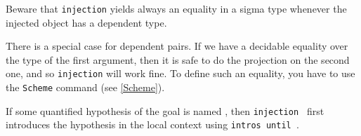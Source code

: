 Beware that \texttt{injection} yields always an equality in a sigma type
whenever the injected object has a dependent type.

\Rem There is a special case for dependent pairs. If we have a decidable 
equality over the type of the first argument, then it is safe to do 
the projection on the second one, and so {\tt injection} will work fine.
To define such an equality, you have to use the {\tt Scheme} command 
(see \ref{Scheme}).

\Rem If some quantified hypothesis of the goal is named {\ident}, then
{\tt injection {\ident}} first introduces the hypothesis in the local
context using \texttt{intros until \ident}.

\begin{ErrMsgs}
\item {}
\item {}
\item {}
\end{ErrMsgs}

